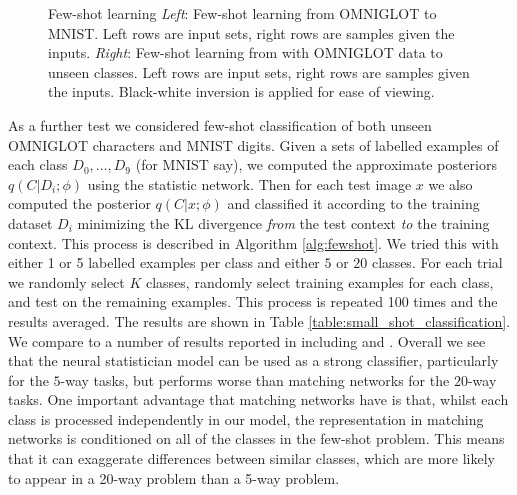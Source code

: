 \documentclass{article} %
\begin{document}
\begin{figure}
\begin{minipage}{0.5\textwidth}
\end{minipage}
\caption{Few-shot learning \emph{Left}: Few-shot learning from OMNIGLOT to MNIST. Left rows are input sets, right rows are samples given the inputs. \emph{Right}: Few-shot learning from with OMNIGLOT data to unseen classes. Left rows are input sets, right rows are samples given the inputs. Black-white inversion is applied for ease of viewing. \label{fig:small_shot}}
\vspace{-1em}
\end{figure}

As a further test we considered few-shot classification of both unseen OMNIGLOT characters and MNIST digits. Given a sets of labelled examples of each class $D_0, \dots, D_9$ (for MNIST say), we computed the approximate posteriors $q(C | D_i ; \phi )$ using the statistic network. Then for each test image $x$ we also computed the posterior $q(C | x ; \phi)$ and classified it according to the training dataset $D_i$ minimizing the KL divergence \emph{from} the test context \emph{to} the training context. This process is described in Algorithm \ref{alg:fewshot}. We tried this with either 1 or 5 labelled examples per class and either $5$ or $20$ classes. For each trial we randomly select $K$ classes, randomly select training examples for each class, and test on the remaining examples. This process is repeated 100 times and the results averaged. The results are shown in Table \ref{table:small_shot_classification}. We compare to a number of results reported in \citet{matching} including \citet{mann}  and \citet{siamese_one_shot}. Overall we see that the neural statistician model can be used as a strong classifier, particularly for the $5$-way tasks, but performs worse than matching networks for the $20$-way tasks. One important advantage that matching networks have is that, whilst each class is processed independently in our model, the representation in matching networks is conditioned on all of the classes in the few-shot problem. This means that it can exaggerate differences between similar classes, which are more likely to appear in a 20-way problem than a 5-way problem.
\vspace{-1em}
\end{document}

